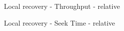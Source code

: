 \begin{frame}{Local recovery - Throughput - relative}

\end{frame}

\begin{frame}{Local recovery - Seek Time - relative}

\end{frame}